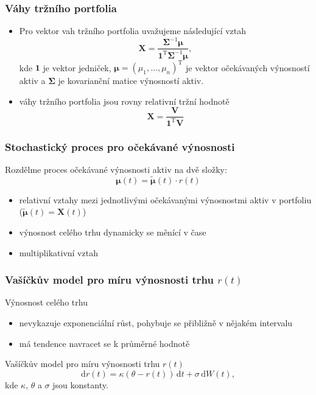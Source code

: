\documentclass[xcolor=dvipsnames]{beamer}
\theoremstyle{definition} \newtheorem{definice}[veta]{Definice}
\theoremstyle{remark}
\begin{document}
\begin{frame}
  \frametitle{Váhy tržního portfolia}
  \begin{itemize}
   \item
   Pro vektor vah tržního portfolia uvažujeme následující vztah
    \begin{equation} \label{vahy}
     \boldsymbol{X}=\frac{\boldsymbol{\Sigma}^{-1}\boldsymbol{\mu}}{\boldsymbol{1}^\mathrm{T}\boldsymbol{\Sigma}^{-1}\boldsymbol{\mu}},
    \end{equation}
    kde $\boldsymbol{1}$ je vektor jedniček, $\boldsymbol{\mu}=(\mu_1,\dots,\mu_n)^\mathrm{T}$ je vektor očekávaných výnosností aktiv
    a $\boldsymbol{\Sigma}$ je kovarianční matice výnosností aktiv.
   
   \item váhy tržního portfolia jsou rovny relativní tržní hodnotě
    \begin{equation} \label{market_value}
    \boldsymbol{X}=\frac{\boldsymbol{V}}{\boldsymbol{1}^\mathrm{T}\boldsymbol{V}}
    \end{equation}
  \end{itemize}
\end{frame}

\begin{frame}
  \frametitle{Stochastický proces pro očekávané výnosnosti}
  Rozdělme proces očekávané výnosnosti aktiv na dvě složky:
  \begin{equation} \label{vynos}
\boldsymbol{\mu}(t) =\tilde{\boldsymbol{\mu}}(t)\cdot r(t)
\end{equation}
    \begin{itemize}
   \item  relativní vztahy mezi jednotlivými očekávanými výnosnostmi aktiv v portfoliu ($\tilde{\boldsymbol{\mu}}(t)=\boldsymbol{X}(t)$)
   \item výnosnost celého trhu dynamicky se měnící v čase
   \item multiplikativní vztah
     \end{itemize}
\end{frame}

\begin{frame}
  \frametitle{Vašíčkův model pro míru výnosnosti trhu $r(t)$}
  Výnosnost celého trhu
      \begin{itemize}
   \item nevykazuje exponenciální růst, pohybuje se přibližně v nějakém intervalu
   \item má tendence navracet se k průměrné hodnotě
     \end{itemize}
     \vspace{0.5cm}
     Vašíčkův model pro míru výnosnosti trhu $r(t)$
     \begin{equation} 
\mathrm{d}r(t)=\kappa(\theta-r(t))\,\mathrm{d}t+\sigma\,\mathrm{d}W(t),
\end{equation}
kde $\kappa$, $\theta$ a $\sigma$ jsou konstanty.
\end{frame}
\end{document}
